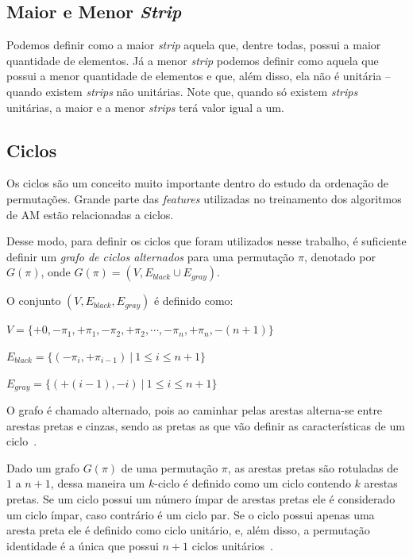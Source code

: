 \documentclass[runningheads,a4paper]{llncs}
\begin{document}
\subsection{Maior e Menor \textit{Strip}}

Podemos definir como a maior \textit{strip} aquela que, dentre todas, possui a maior quantidade de elementos. Já a menor \textit{strip} podemos definir como aquela que possui a menor quantidade de elementos e que, além disso, ela não é unitária -- quando existem \textit{strips} não unitárias. Note que, quando só existem \textit{strips} unitárias, a maior e a menor \textit{strips} terá valor igual a um.


\subsection{Ciclos}

Os ciclos são um conceito muito importante dentro do estudo da ordenação de permutações. Grande parte das \textit{features} utilizadas no treinamento dos algoritmos de AM estão relacionadas a ciclos.

Desse modo, para definir os ciclos que foram utilizados nesse trabalho, é suficiente definir um \textit{grafo de ciclos alternados} para uma permutação $\pi$, denotado por $G(\pi)$, onde $G(\pi)=(V, E_{black} \cup E_{gray})$.

O conjunto $(V, E_{black}, E_{gray})$ é definido como:
\begin{description}
    \item[Conjunto de Vértices] 
    \item $V=\{+0, -\pi_1, +\pi_1, -\pi_2, +\pi_2, \cdots, -\pi_n, +\pi_n, -(n+1) \}$
    \item
    \item[Conjunto de arestas pretas] 
    \item $E_{black}= \{(-\pi_i, +\pi_{i-1}) \  | \ 1 \leq i \leq n+1 \}$
    \item
    \item[Conjunto de arestas cinzas] 
    \item $E_{gray}= \{(+(i-1), -i) \ | \ 1 \leq i \leq n+1 \}$
\end{description}

O grafo é chamado alternado, pois ao caminhar pelas arestas alterna-se entre arestas pretas e cinzas, sendo as pretas as que vão definir as características de um ciclo~\cite{daSilva,Christie,Rahman}.

Dado um grafo $G(\pi)$ de uma permutação $\pi$, as arestas pretas são rotuladas de $1$ a $n+1$, dessa maneira um $k$-ciclo é definido como um ciclo contendo $k$ arestas pretas. Se um ciclo possui um número ímpar de arestas pretas ele é considerado um ciclo ímpar, caso contrário é um ciclo par. Se o ciclo possui apenas uma aresta preta ele é definido como ciclo unitário, e, além disso, a permutação identidade é a única que possui $n+1$ ciclos unitários~\cite{Rahman}.
\end{document}

